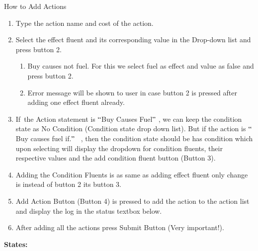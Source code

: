 \documentclass[12pt]{article}
\begin{document}
\vspace{\baselineskip}
How to Add Actions \par

\begin{enumerate}
	\item Type the action name and cost of the action.\par

	\item Select the effect fluent and its corresponding value in the Drop-down list and press button 2.\par

\begin{enumerate}
	\item Buy causes not fuel. For this we select fuel as effect and value as false and press button 2.\par

	\item Error message will be shown to user in case button 2 is pressed after adding one effect fluent already.\par


\end{enumerate}
	\item If\ the Action statement is $``$Buy Causes Fuel$"$ , we can keep the condition state as No Condition (Condition state drop down list). But if the action is  $``$ Buy causes fuel if.$"$ \ , then the condition state should be has condition which upon selecting will display the dropdown for condition fluents, their respective values and the add condition fluent button  (Button 3).\par

	\item Adding the Condition Fluents is as same as adding effect fluent only change is instead of button 2 its button 3.\par

	\item Add Action Button (Button 4) is pressed to add the action to the action list and display the log in the status textbox below.\par

	\item After adding all the actions press Submit Button (Very important!).
\end{enumerate}\par


\vspace{\baselineskip}
\textbf{States:}\par
\end{document}
